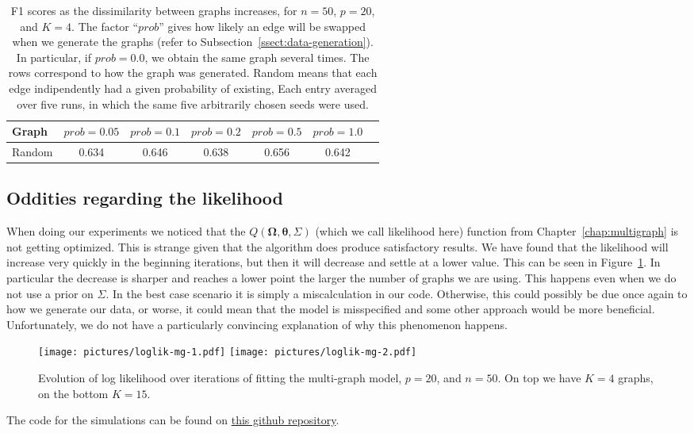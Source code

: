 \documentclass[a4paper, 11pt, oneside]{report}
\newcommand{\1}{\mathds{1}}
\newcommand{\bOmega}{\mathbf{\Omega}}
\newcommand{\btheta}{\mathbf{\theta}}
\begin{document}
\begin{table}[ht]
  \caption{F1 scores as the dissimilarity between graphs increases, for $n=50$, $p=20$, and $K=4$.
    The factor ``$prob$'' gives how likely an edge will be swapped when we generate the graphs
    (refer to Subsection~\ref{ssect:data-generation}). 
    In particular, if $prob = 0.0$, we obtain the same graph several times.
    The rows correspond to how the graph was generated.
    Random means that each edge indipendently had a given probability of existing, 
    Each entry averaged over five runs, in which the same five arbitrarily chosen seeds were used.
  }
  \label{tab:mg-more-random}
  \begin{center}
    \begin{tabular}[c]{l|cccccc}
      \toprule
      Graph  & $prob = 0.05$ & $prob = 0.1$ & $prob = 0.2$ & $prob = 0.5$ & $prob = 1.0$ \\
      \midrule
      Random  & 0.634 & 0.646 & 0.638 & 0.656 & 0.642 \\
      \bottomrule
    \end{tabular}
  \end{center}
\end{table}

\subsection{Oddities regarding the likelihood}
When doing our experiments we noticed that the $Q(\bOmega, \btheta, \Sigma)$ (which we call likelihood here) function from Chapter~\ref{chap:multigraph}
is not getting optimized. This is strange given that the algorithm does produce satisfactory results.
We have found that the likelihood will increase very quickly in the beginning iterations,
but then it will decrease and settle at a lower value. This can be seen in Figure~\ref{fig:loglik-mg-1}.
In particular the decrease is sharper and reaches a lower point the larger the number of graphs we are using.
This happens even when we do not use a prior on $\Sigma$.
In the best case scenario it is simply a miscalculation in our code.
Otherwise, this could possibly be due once again to how we generate our data, or worse,
it could mean that the model is misspecified and some other approach would be more beneficial.
Unfortunately, we do not have a particularly convincing explanation of why this phenomenon happens.

\begin{figure}[ht]
  \begin{center}
    \texttt{[image: pictures/loglik-mg-1.pdf]}
    \texttt{[image: pictures/loglik-mg-2.pdf]}
    \hfill
  \end{center}
  \caption{Evolution of log likelihood over iterations of fitting the multi-graph model, $p=20$, and $n=50$. On top we have $K=4$ graphs, on the bottom $K=15$.}
  \label{fig:loglik-mg-1}
\end{figure}
The code for the simulations can be found on
\href{https://github.com/jkasalt/pdm_summary}{this github repository}.
\end{document}

